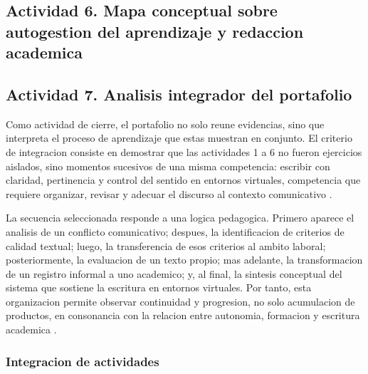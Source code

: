 \documentclass[
	spanish,
	letterpaper, oneside
]{article}
\begin{document}
\clearpage
\subsection{Actividad 6. Mapa conceptual sobre autogestion del aprendizaje y redaccion academica}


\clearpage
\subsection{Actividad 7. Analisis integrador del portafolio}

Como actividad de cierre, el portafolio no solo reune evidencias, sino que interpreta el proceso de aprendizaje que estas muestran en conjunto. El criterio de integracion consiste en demostrar que las actividades 1 a 6 no fueron ejercicios aislados, sino momentos sucesivos de una misma competencia: escribir con claridad, pertinencia y control del sentido en entornos virtuales, competencia que requiere organizar, revisar y adecuar el discurso al contexto comunicativo \citep{correaManualBasicoEscritura2018,nunezcortesEscrituraAcademicaTeoria2015}.

La secuencia seleccionada responde a una logica pedagogica. Primero aparece el analisis de un conflicto comunicativo; despues, la identificacion de criterios de calidad textual; luego, la transferencia de esos criterios al ambito laboral; posteriormente, la evaluacion de un texto propio; mas adelante, la transformacion de un registro informal a uno academico; y, al final, la sintesis conceptual del sistema que sostiene la escritura en entornos virtuales. Por tanto, esta organizacion permite observar continuidad y progresion, no solo acumulacion de productos, en consonancia con la relacion entre autonomia, formacion y escritura academica \citep{ayalaTallerLecturaRedaccion2010,vitoriaEscrituraAcademicaFormacion2019}.

\subsubsection{Integracion de actividades}
\end{document}

